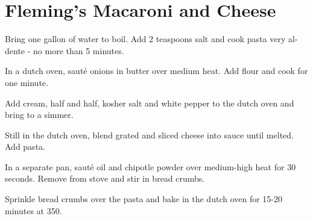 
\section{Fleming's Macaroni and Cheese}
\begin{recipe}



Bring one gallon of water to boil. Add 2 teaspoons salt and cook pasta very al-dente - no more than 5 minutes.


In a dutch oven, sauté onions in butter over medium heat. Add flour and cook for one minute.


Add cream, half and half, kosher salt and white pepper to the dutch oven and bring to a simmer.


Still in the dutch oven, blend grated and sliced cheese into sauce until melted. Add pasta.


In a separate pan, sauté oil and chipotle powder over medium-high heat for 30 seconds. Remove from stove and stir in bread crumbs.

Sprinkle bread crumbs over the pasta and bake in the dutch oven for 15-20 minutes at 350\degree{}.

\end{recipe}
